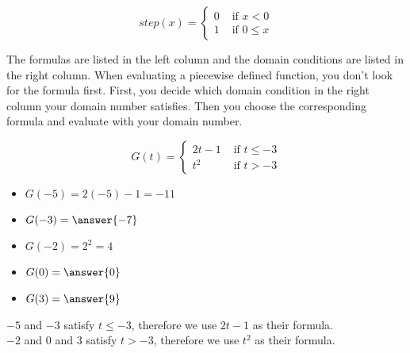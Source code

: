 \documentclass{ximera}
\begin{document}
\[
step(x) = 
\begin{cases}
  0 & \text{ if } x < 0 \\
  1 & \text{ if } 0 \leq x
\end{cases}
\]

The formulas are listed in the left column and the domain conditions are listed in the right column.  When evaluating a piecewise defined function, you don't look for the formula first.  First, you decide which domain condition in the right column your domain number satisfies.  Then you choose the corresponding formula and evaluate with your domain number.











\begin{example}

\[
G(t) = 
\begin{cases}
  2t-1 & \text{ if } t \leq -3 \\
  t^2 & \text{ if } t > -3
\end{cases}
\]


\begin{itemize}
\item $G(-5) = 2(-5) - 1 = -11$  
\item $G(-3) = \answer{-7}$ 
\item $G(-2) = 2^2 = 4$ 
\item $G(0) = \answer{0}$ 
\item $G(3) = \answer{9}$ 
\end{itemize}


$-5$ and $-3$ satisfy $t \leq -3$, therefore we use $2t-1$ as their formula. \\
$-2$ and $0$ and $3$ satisfy $t > -3$, therefore we use $t^2$ as their formula. \\

\end{example}
\end{document}
